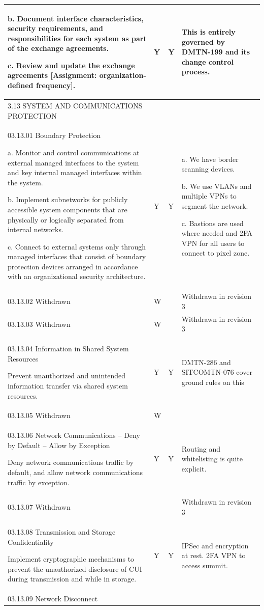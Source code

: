 \begin{longtable} {|p{}|p{}|p{}|p{} |}
{b. Document interface characteristics, security requirements, and responsibilities for each system as part of the exchange agreements.

c. Review and update the exchange agreements [Assignment: organization-defined frequency].}&{Y}&{Y}&{This is entirely governed by DMTN-199 and its change control process.} \\ \hline
{3.13 SYSTEM AND COMMUNICATIONS PROTECTION}&&& \\ \hline
{03.13.01 Boundary Protection

a. Monitor and control communications at external managed interfaces to the system and key internal managed interfaces within the system.

b. Implement subnetworks for publicly accessible system components that are physically or logically separated from internal networks.

c. Connect to external systems only through managed interfaces that consist of boundary protection devices arranged in accordance with an organizational security architecture.}&{Y}&{Y}&{a. We have border scanning devices.

b. We use VLANs and multiple VPNs to segment the network.

c. Bastions are used where needed and 2FA VPN for all users to connect to pixel zone.} \\ \hline
{03.13.02 Withdrawn}&{W}&{}&{Withdrawn in revision 3} \\ \hline
{03.13.03 Withdrawn}&{W}&{}&{Withdrawn in revision 3} \\ \hline
{03.13.04 Information in Shared System Resources

Prevent unauthorized and unintended information transfer via shared system resources.}&{Y}&{Y}&{DMTN-286 and SITCOMTN-076 cover ground rules on this} \\ \hline
{03.13.05 Withdrawn}&{W}&& \\ \hline
{03.13.06 Network Communications – Deny by Default – Allow by Exception

Deny network communications traffic by default, and allow network communications traffic by exception.}&{Y}&{Y}&{Routing and whitelisting is quite explicit.} \\ \hline
{03.13.07 Withdrawn}&{ }&{}&{Withdrawn in revision 3} \\ \hline
{03.13.08 Transmission and Storage Confidentiality

Implement cryptographic mechanisms to prevent the unauthorized disclosure of CUI during transmission and while in storage.}&{Y}&{Y}&{IPSec and encryption at rest. 2FA VPN to access summit.} \\ \hline
{03.13.09 Network Disconnect

}
\end{longtable}
